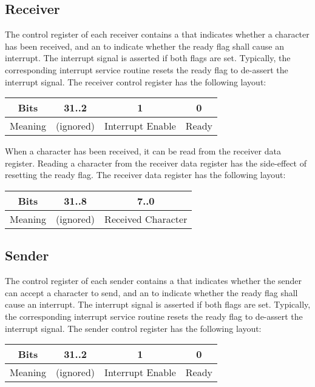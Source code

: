 \subsection{Receiver}

The control register of each receiver contains a  that indicates whether a character has been received, and an  to indicate whether the ready flag shall cause an interrupt. The interrupt signal is asserted if both flags are set. Typically, the corresponding interrupt service routine resets the ready flag to de-assert the interrupt signal. The receiver control register has the following layout:

\begin{tabular}{|c|c|c|c|}
\hline
Bits & 31..2 & 1 & 0\\
\hline
Meaning & (ignored) & Interrupt Enable & Ready\\
\hline
\end{tabular}

When a character has been received, it can be read from the receiver data register. Reading a character from the receiver data register has the side-effect of resetting the ready flag. The receiver data register has the following layout:

\begin{tabular}{|c|c|c|}
\hline
Bits & 31..8 & 7..0\\
\hline
Meaning & (ignored) & Received Character\\
\hline
\end{tabular}

\subsection{Sender}

The control register of each sender contains a  that indicates whether the sender can accept a character to send, and an  to indicate whether the ready flag shall cause an interrupt. The interrupt signal is asserted if both flags are set. Typically, the corresponding interrupt service routine resets the ready flag to de-assert the interrupt signal. The sender control register has the following layout:

\begin{tabular}{|c|c|c|c|}
\hline
Bits & 31..2 & 1 & 0\\
\hline
Meaning & (ignored) & Interrupt Enable & Ready\\
\hline
\end{tabular}


